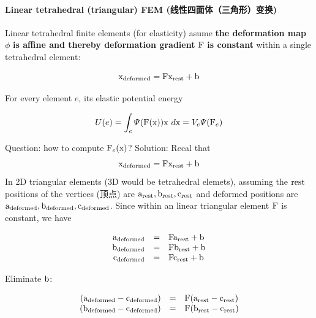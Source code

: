 \documentclass[11pt]{article}
\begin{document}
\hypertarget{linear-tetrahedral-triangular-fem-ux7ebfux6027ux56dbux9762ux4f53ux4e09ux89d2ux5f62ux53d8ux6362}{%
\paragraph{Linear tetrahedral (triangular) FEM
(线性四面体（三角形）变换)}\label{linear-tetrahedral-triangular-fem-ux7ebfux6027ux56dbux9762ux4f53ux4e09ux89d2ux5f62ux53d8ux6362}}

Linear tetrahedral finite elements (for elasticity) asume \textbf{the
deformation map} \(\phi\) \textbf{is affine and thereby deformation
gradient} \({\rm F}\) \textbf{is constant} within a single tetrahedral
element:

\begin{equation*}
{\rm x_{deformed}=Fx_{rest}+b}
\end{equation*}

For every element \(e\), its elastic potential energy

\begin{equation*}
U(e)=\int_{e}\varPsi({\rm F(x)}){\rm x}~d{\rm x}=V_{e}\varPsi({\rm F}_{e})
\end{equation*}

Question: how to compute \({\rm F}_{e}({\rm x})\)? Solution: Recal that
\begin{equation*}
{\rm x_{deformed}=Fx_{rest}+b}
\end{equation*} In 2D triangular elements (3D would be tetrahedral
elemets), assuming the \({\rm rest}\) positions of the vertices (顶点)
are \({\rm a_{rest},b_{rest},c_{rest}}\) and deformed positions are
\({\rm a_{deformed},b_{deformed},c_{deformed}}\). Since within an linear
triangular element \({\rm F}\) is constant, we have

\begin{equation*}
 \begin{array}{rcl}
 {\rm a_{deformed}}&=&{\rm Fa_{rest}+b} \\
 {\rm b_{deformed}}&=&{\rm Fb_{rest}+b} \\
 {\rm c_{deformed}}&=&{\rm Fc_{rest}+b}
 \end{array}
 \end{equation*}

Eliminate \({\rm b}\):

\begin{equation*}
 \begin{array}{rcl}
 {\rm (a_{deformed}-c_{deformed})}&=&{\rm F(a_{rest}-c_{rest})} \\
 {\rm (b_{deformed}-c_{deformed})}&=&{\rm F(b_{rest}-c_{rest})}
 \end{array}
 \end{equation*}
\end{document}
